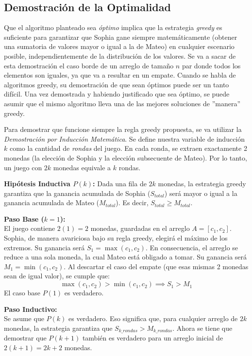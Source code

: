 \subsection{Demostración de la Optimalidad}

Que el algoritmo planteado sea \textit{óptimo} implica que la estrategia \textit{greedy} es suficiente para garantizar que Sophia gane siempre matemáticamente (obtener una sumatoria de valores mayor o igual a la de Mateo) en cualquier escenario posible, independientemente de la distribución de los valores. 
Se va a sacar de esta demostración el caso borde de un arreglo de tamaño $n$ par donde todos los elementos son iguales, ya que va a resultar en un empate. Cuando se habla de algoritmos greedy, su demostración de que sean óptimos puede ser un tanto difícil. Una vez demostrada y habiendo justificado que sea óptimo, se puede asumir que el mismo algoritmo lleva una de las mejores soluciones de ''manera'' greedy.

Para demostrar que funcione siempre la regla greedy propuesta, se va utilizar la \textit{Demostración por Inducción Matemática}. Se define nuestra variable de inducción $k$ como la cantidad de \textit{rondas} del juego. En cada ronda, se extraen exactamente 2 monedas (la elección de Sophia y la elección subsecuente de Mateo). Por lo tanto, un juego con $2k$ monedas equivale a $k$ rondas.

\textbf{Hipótesis Inductiva $P(k)$:} 
Dada una fila de $2k$ monedas, la estrategia greedy garantiza que la ganancia acumulada de Sophia ($S_{total}$) será mayor o igual a la ganancia acumulada de Mateo ($M_{total}$). Es decir, $S_{total} \ge M_{total}$.

\vspace{1ex}
\noindent\textbf{Paso Base ($k = 1$):} \\
El juego contiene $2(1) = 2$ monedas, guardadas en el arreglo $A = [c_1, c_2]$. 
Sophia, de manera avariciosa bajo su regla greedy, elegirá el máximo de los extremos. Su ganancia será $S_1 = \max(c_1, c_2)$.
En consecuencia, el arreglo se reduce a una sola moneda, la cual Mateo está obligado a tomar. Su ganancia será $M_1 = \min(c_1, c_2)$.
Al descartar el caso del empate (que esas mismas 2 monedas sean de igual valor), se cumple que:
\[ \max(c_1, c_2) > \min(c_1, c_2) \implies S_1 > M_1 \]
El caso base $P(1)$ es verdadero.

\vspace{1ex}
\noindent\textbf{Paso Inductivo:} \\
Se asume que $P(k)$ es verdadero. Eso significa que, para cualquier arreglo de $2k$ monedas, la estrategia garantiza que $S_{k\_rondas} > M_{k\_rondas}$.
Ahora se tiene que demostrar que $P(k+1)$ también es verdadero para un arreglo inicial de $2(k+1) = 2k + 2$ monedas.

